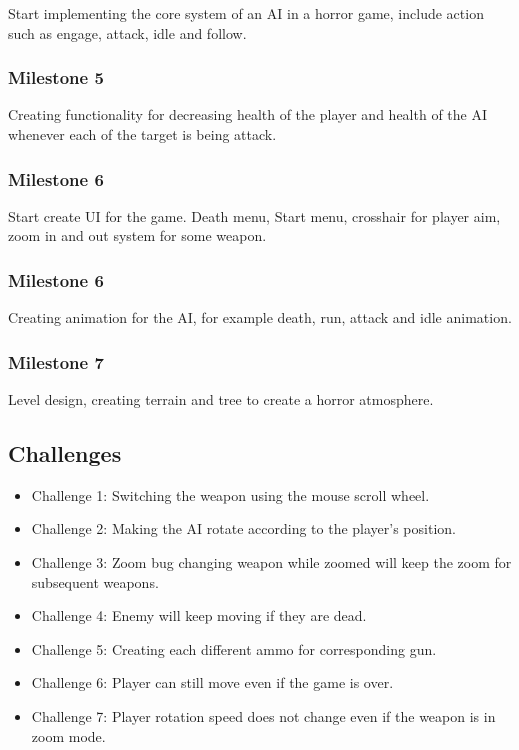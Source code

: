 \documentclass[sigconf]{acmart}
\begin{document}
Start implementing the core system of an AI in a horror game, include action such as engage, attack, idle and follow.

\subsubsection{Milestone 5}

Creating functionality for decreasing health of the player and health of the AI whenever each of the target is being attack.

\subsubsection{Milestone 6}

Start create UI for the game. Death menu, Start menu, crosshair for player aim, zoom in and out system for some weapon.

\subsubsection{Milestone 6}

Creating animation for the AI, for example death, run, attack and idle animation.

\subsubsection{Milestone 7}

Level design, creating terrain and tree to create a horror atmosphere.

\subsection{Challenges}

\begin{itemize}
    \item Challenge 1: Switching the weapon using the mouse scroll wheel.
    \item Challenge 2: Making the AI rotate according to the player's position.
    \item Challenge 3: Zoom bug changing weapon while zoomed will keep the zoom for subsequent weapons.
    \item Challenge 4: Enemy will keep moving if they are dead.
    \item Challenge 5: Creating each different ammo for corresponding gun.
    \item Challenge 6: Player can still move even if the game is over.
    \item Challenge 7: Player rotation speed does not change even if the weapon is in zoom mode.
    
\end{itemize}
\end{document}
